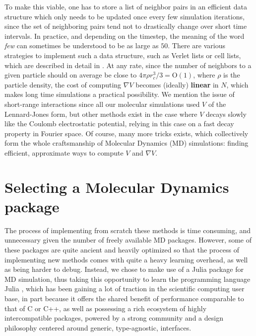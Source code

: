 To make this viable, one has to store a list of neighbor pairs in an efficient data structure which only needs to be updated once every few simulation iterations, since the set of neighboring pairs tend not to drastically change over short time intervals.
In practice, and depending on the timestep, the meaning of the word \textit{few} can sometimes be understood to be as large as $50$.
There are various strategies to implement such a data structure, such as Verlet lists or cell lists, which are described in detail in \cite[Section 5.3]{AT89}.
At any rate, since the number of neighbors to a given particle should on average be close to $4\pi\rho r_c^3/3=\mathrm{O}(1)$, where $\rho$ is the particle density, the cost of computing $\nabla V$ becomes (ideally) \textbf{linear} in $N$,
which makes long time simulations a practical possibility. 
We mention the issue of short-range interactions since all our molecular simulations used $V$ of the Lennard-Jones form, but other methods exist in the case where $V$ decays slowly like the Coulomb electrostatic potential, relying in this case on a fast decay property in Fourier space.
Of course, many more tricks exists, which collectively form the whole craftsmanship of Molecular Dynamics (MD) simulations: finding efficient, approximate ways to compute $V$ and $\nabla V$.

\section{Selecting a Molecular Dynamics package}
The process of implementing from scratch these methods is time consuming, and unnecessary given the number of freely available MD packages. 
However, some of these packages are quite ancient and heavily optimized so that the process of implementing new methods comes with quite a heavy learning overhead, as well as being harder to debug.
Instead, we chose to make use of a Julia package for MD simulation, thus taking this opportunity to learn the programming language Julia \cite{bezanson2017julia}, which has been gaining a lot of traction in the scientific computing user base, 
in part because it offers the shared benefit of performance comparable to that of C or C++, as well as possessing a rich ecosystem of highly intercompatible packages, powered by a strong community and a design philosophy centered around generic, type-agnostic, interfaces.

